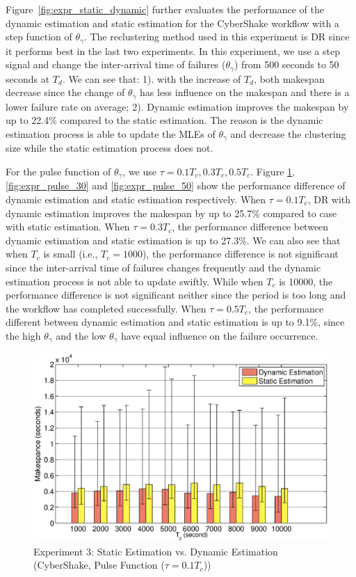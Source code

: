 \documentclass{IOS-Book-Article}
\begin{document}
Figure~\ref{fig:expr_static_dynamic} further evaluates the performance of the dynamic estimation and static estimation for the CyberShake workflow with a step function of $\theta_{\gamma}$. The reclustering method used in this experiment is DR since it performs best in the last two experiments. In this experiment, we use a step signal and change the inter-arrival time of failures ($\theta_{\gamma}$) from 500 seconds to 50 seconds at $T_d$. We can see that: 1). with the increase of $T_d$, both makespan decrease since the change of  $\theta_{\gamma}$ has less influence on the makespan and there is a lower failure rate on average; 2). Dynamic estimation improves the makespan by up to 22.4\% compared to the static estimation. The reason is the dynamic estimation process is able to update the MLEs of $\theta_{\gamma}$ and decrease the clustering size while the static estimation process does not. 

For the pulse function of $\theta_{\gamma}$, we use $\tau=0.1T_c, 0.3T_c, 0.5T_c$. Figure \ref{fig:expr_pulse_10}, \ref{fig:expr_pulse_30} and \ref{fig:expr_pulse_50} show the performance difference of dynamic estimation and static estimation respectively. When $\tau=0.1T_c$, DR with dynamic estimation improves the makespan by up to 25.7\% compared to case with static estimation. When $\tau=0.3T_c$, the performance difference between dynamic estimation and static estimation is up to 27.3\%. We can also see that when $T_c$ is small (i.e., $T_c=1000$), the performance difference is not significant since the inter-arrival time of failures changes frequently and the dynamic estimation process is not able to update swiftly. While when $T_c$ is 10000, the performance difference is not significant neither since the period is too long and the workflow has completed successfully. When $\tau=0.5T_c$, the performance different between dynamic estimation and static estimation is up to 9.1\%, since the high $\theta_{\gamma}$ and the low $\theta_{\gamma}$ have equal influence on the failure occurrence. 


\begin{figure}[!htb]
\centering
  \includegraphics[width=1\linewidth]{pulse_t10.eps}
  \caption{Experiment 3: Static Estimation vs. Dynamic Estimation (CyberShake, Pulse Function ($\tau=0.1T_c$))}
  \label{fig:expr_pulse_10}
\end{figure}
\end{document}
